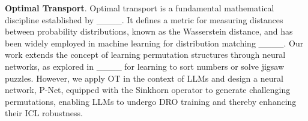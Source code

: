 \noindent \textbf{Optimal Transport}. 
Optimal transport is a fundamental mathematical discipline established by ____. It defines a metric for measuring distances between probability distributions, known as the Wasserstein distance, and has been widely employed in machine learning for distribution matching ____. 
Our work extends the concept of learning permutation structures through neural networks, as explored in ____ for learning to sort numbers or solve jigsaw puzzles. 
However, we apply OT in the context of LLMs and design a neural network, P-Net, equipped with the Sinkhorn operator to generate challenging permutations, enabling LLMs to undergo DRO training and thereby enhancing their ICL robustness.